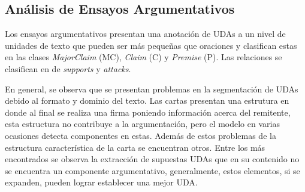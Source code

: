 \documentclass[a4paper,11pt,twocolumn,twoside]{article}
\begin{document}

\subsection{Análisis de Ensayos Argumentativos}


Los ensayos argumentativos presentan una anotación de UDAs a un nivel de unidades de texto que pueden ser 
más pequeñas que oraciones y clasifican estas en las clases \textit{MajorClaim} (MC), \textit{Claim} (C) y \textit{Premise}
(P). Las relaciones se clasifican en de \textit{supports} y \textit{attacks}. 

En general, se observa que se presentan problemas en la segmentación de UDAs debido al formato y dominio del texto.
Las cartas presentan una estrutura en donde al final se realiza una firma poniendo información acerca del remitente,
esta estructura no contribuye a la argumentación, pero el modelo en varias ocasiones detecta componentes en estas. 
Además de estos problemas de la estructura característica de la carta se encuentran otros. Entre los más 
encontrados se observa la extracción de supuestas UDAs que en su contenido no se encuentra un componente argumentativo, 
generalmente, estos elementos, si se expanden, pueden lograr establecer una mejor UDA.
\end{document}
